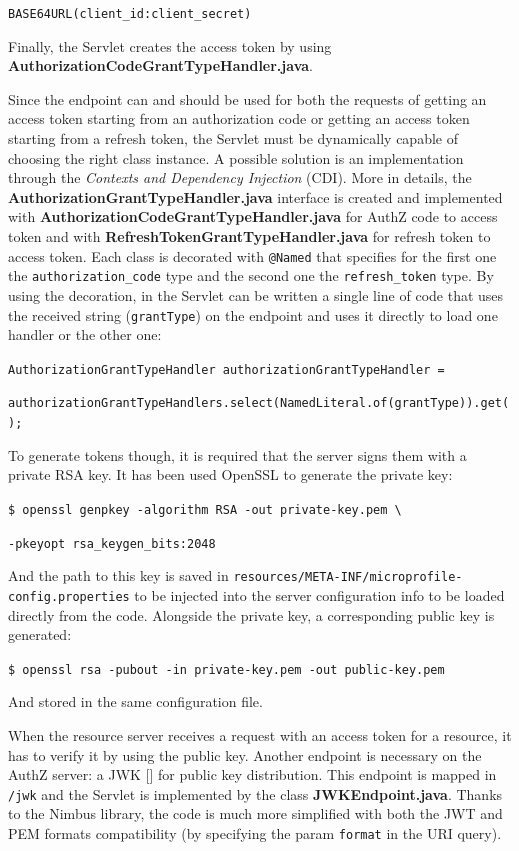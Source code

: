   \texttt{BASE64URL(client\_id:client\_secret)}

\noindent Finally, the Servlet creates the access token by using \textbf{AuthorizationCodeGrantTypeHandler.java}. 

Since the endpoint can and should be used for both the requests of getting an access token starting from an authorization code or getting an access token starting from a refresh token, the Servlet must be dynamically capable of choosing the right class instance. A possible solution is an implementation through the \textit{Contexts and Dependency Injection} (CDI). More in details, the \textbf{AuthorizationGrantTypeHandler.java} interface is created and implemented with \textbf{AuthorizationCodeGrantTypeHandler.java} for AuthZ code to access token and with \textbf{RefreshTokenGrantTypeHandler.java} for refresh token to access token. Each class is decorated with \texttt{@Named} that specifies for the first one the \texttt{authorization\_code} type and the second one the \texttt{refresh\_token} type. By using the decoration, in the Servlet can be written a single line of code that uses the received string (\texttt{grantType}) on the endpoint and uses it directly to load one handler or the other one:

\texttt{AuthorizationGrantTypeHandler authorizationGrantTypeHandler = } 

\hspace{0.8cm} \texttt{authorizationGrantTypeHandlers.select(NamedLiteral.of(grantType)).get();}

\noindent To generate tokens though, it is required that the server signs them with a private RSA key. It has been used OpenSSL to generate the private key:
 
  \texttt{\$ openssl genpkey -algorithm RSA -out private-key.pem \textbackslash}
  
  \hspace{0.8cm} \texttt{-pkeyopt rsa\_keygen\_bits:2048}

\noindent And the path to this key is saved in \texttt{resources/META-INF/microprofile-config.properties} to be injected into the server configuration info to be loaded directly from the code. Alongside the private key, a corresponding public key is generated:
 
  \texttt{\$ openssl rsa -pubout -in private-key.pem -out public-key.pem}

\noindent And stored in the same configuration file.

When the resource server receives a request with an access token for a resource, it has to verify it by using the public key. Another endpoint is necessary on the AuthZ server: a JWK [] for public key distribution. This endpoint is mapped in \texttt{/jwk} and the Servlet is implemented by the class \textbf{JWKEndpoint.java}. Thanks to the Nimbus library, the code is much more simplified with both the JWT and PEM formats compatibility (by specifying the param \texttt{format} in the URI query).

